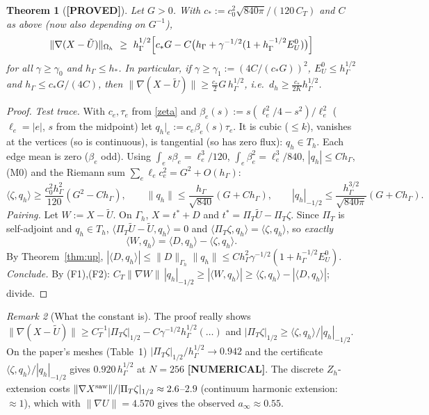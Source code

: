 \documentclass[11pt]{article}
\newtheorem{theorem}{Theorem}
\theoremstyle{remark}
\newtheorem{remark}[theorem]{Remark}
\newcommand{\hG}{h_\Gamma}
\newcommand{\Gh}{\Gamma_h}
\newcommand{\Oh}{\Omega_h}
\newcommand{\Zh}{Z_h}
\newcommand{\Th}{T_h}
\newcommand{\PT}{\Pi_T}
\newcommand{\norm}[1]{\|#1\|}
\newcommand{\ip}[2]{\langle #1,#2\rangle}
\newcommand{\Ut}{\tilde U}
\newcommand{\EU}{E^{0}_{U}}
\newcommand{\lab}[1]{\textbf{[#1]}}
\begin{document}
\begin{theorem}[\lab{PROVED}]\label{thm:low}
Let $G>0$. With $c_\ast:=c_0^2\sqrt{840\pi}/(120\,C_T)$ and $C$ as above (now also depending on $G^{-1}$),
\[
\norm{\nabla(X-\Ut)}_{\Oh}\ \ge\ \hG^{1/2}\Bigl[c_\ast G-C\bigl(\hG+\gamma^{-1/2}(1+\hG^{-1/2}\EU)\bigr)\Bigr]
\]
for all $\gamma\ge\gamma_0$ and $\hG\le h_\ast$. In particular, if $\gamma\ge\gamma_1:=(4C/(c_\ast G))^2$, $\EU\le\hG^{1/2}$ and $\hG\le c_\ast G/(4C)$, then $\norm{\nabla(X-\Ut)}\ge\frac{c_\ast}2G\,\hG^{1/2}$, i.e.\ $d_h\ge\frac{c_\ast}{2K}\hG^{1/2}$.
\end{theorem}
\begin{proof}
\emph{Test trace.} With $c_e,\tau_e$ from \eqref{zeta} and $\beta_e(s):=s(\ell_e^2/4-s^2)/\ell_e^2$ ($\ell_e=|e|$, $s$ from the midpoint) let $q_h|_e:=c_e\beta_e(s)\tau_e$. It is cubic ($\le k$), vanishes at the vertices (so is continuous), is tangential (so has zero flux): $q_h\in\Th$. Each edge mean is zero ($\beta_e$ odd). Using $\int_es\beta_e=\ell_e^3/120$, $\int_e\beta_e^2=\ell_e^3/840$, $|q_h|\le C\hG$, (M0) and the Riemann sum $\sum_e\ell_ec_e^2=G^2+O(\hG)$:
\[
\ip\zeta{q_h}\ge\frac{c_0^2\hG^2}{120}(G^2-C\hG),\qquad \norm{q_h}\le\frac{\hG}{\sqrt{840}}(G+C\hG),\qquad |q_h|_{-1/2}\le\frac{\hG^{3/2}}{\sqrt{840\pi}}(G+C\hG).
\]
\emph{Pairing.} Let $W:=X-\Ut$. On $\Gh$, $X=t^\ast+D$ and $t^\ast=\PT\Ut-\PT\zeta$. Since $\PT$ is self-adjoint and $q_h\in\Th$, $\ip{\PT\Ut-\Ut}{q_h}=0$ and $\ip{\PT\zeta}{q_h}=\ip\zeta{q_h}$, so \emph{exactly}
\[
\ip W{q_h}=\ip D{q_h}-\ip\zeta{q_h}.
\]
By Theorem~\ref{thm:up}, $|\ip D{q_h}|\le\norm D_{\Gh}\norm{q_h}\le C\hG^2\gamma^{-1/2}(1+\hG^{-1/2}\EU)$.
\emph{Conclude.} By (F1),(F2): $C_T\norm{\nabla W}\,|q_h|_{-1/2}\ge|\ip W{q_h}|\ge\ip\zeta{q_h}-|\ip D{q_h}|$; divide.
\end{proof}

\begin{remark}[What the constant is]\label{rem:const}
The proof really shows $\norm{\nabla(X-\Ut)}\ge C_T^{-1}|\PT\zeta|_{1/2}-C\gamma^{-1/2}\hG^{1/2}(\dots)$ and $|\PT\zeta|_{1/2}\ge\ip\zeta{q_h}/|q_h|_{-1/2}$. On the paper's meshes (Table~1) $|\PT\zeta|_{1/2}/\hG^{1/2}\to0.942$ and the certificate $\ip\zeta{q_h}/|q_h|_{-1/2}$ gives $0.920\,\hG^{1/2}$ at $N=256$ \lab{NUMERICAL}. The discrete $\Zh$-extension costs $\norm{\nabla X^{\rm saw}}/|\PT\zeta|_{1/2}\approx2.6$--$2.9$ (continuum harmonic extension: $\approx1$), which with $\norm{\nabla U}=4.570$ gives the observed $a_\infty\approx0.55$.
\end{remark}
\end{document}
